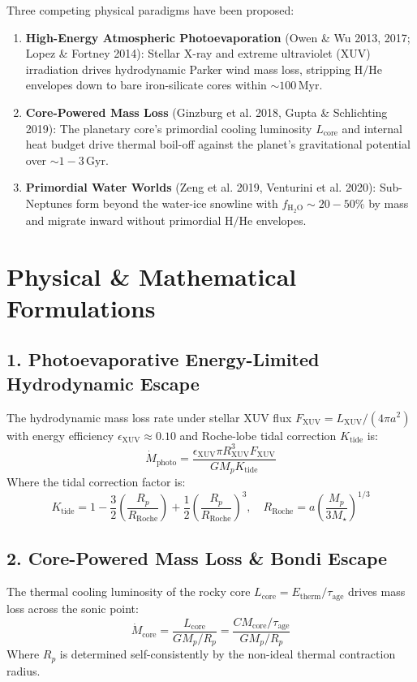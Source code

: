 \documentclass[11pt,a4paper]{article}
\begin{document}
Three competing physical paradigms have been proposed:
\begin{enumerate}
    \item \textbf{High-Energy Atmospheric Photoevaporation} (Owen \& Wu 2013, 2017; Lopez \& Fortney 2014): Stellar X-ray and extreme ultraviolet (XUV) irradiation drives hydrodynamic Parker wind mass loss, stripping $\mathrm{H/He}$ envelopes down to bare iron-silicate cores within $\sim 100\,\mathrm{Myr}$.
    \item \textbf{Core-Powered Mass Loss} (Ginzburg et al. 2018, Gupta \& Schlichting 2019): The planetary core's primordial cooling luminosity $L_{\text{core}}$ and internal heat budget drive thermal boil-off against the planet's gravitational potential over $\sim 1 - 3\,\mathrm{Gyr}$.
    \item \textbf{Primordial Water Worlds} (Zeng et al. 2019, Venturini et al. 2020): Sub-Neptunes form beyond the water-ice snowline with $f_{\mathrm{H_2O}} \sim 20 - 50\%$ by mass and migrate inward without primordial $\mathrm{H/He}$ envelopes.
\end{enumerate}

\section{Physical \& Mathematical Formulations}

\subsection{1. Photoevaporative Energy-Limited Hydrodynamic Escape}
The hydrodynamic mass loss rate under stellar XUV flux $F_{\text{XUV}} = L_{\text{XUV}} / (4\pi a^2)$ with energy efficiency $\epsilon_{\text{XUV}} \approx 0.10$ and Roche-lobe tidal correction $K_{\text{tide}}$ is:
\begin{equation}
\dot{M}_{\text{photo}} = \frac{\epsilon_{\text{XUV}} \pi R_{\text{XUV}}^3 F_{\text{XUV}}}{G M_p K_{\text{tide}}}
\end{equation}
Where the tidal correction factor is:
\begin{equation}
K_{\text{tide}} = 1 - \frac{3}{2}\left(\frac{R_p}{R_{\text{Roche}}}\right) + \frac{1}{2}\left(\frac{R_p}{R_{\text{Roche}}}\right)^3, \quad R_{\text{Roche}} = a \left(\frac{M_p}{3 M_\star}\right)^{1/3}
\end{equation}

\subsection{2. Core-Powered Mass Loss \& Bondi Escape}
The thermal cooling luminosity of the rocky core $L_{\text{core}} = E_{\text{therm}} / \tau_{\text{age}}$ drives mass loss across the sonic point:
\begin{equation}
\dot{M}_{\text{core}} = \frac{L_{\text{core}}}{G M_p / R_p} = \frac{C M_{\text{core}} / \tau_{\text{age}}}{G M_p / R_p}
\end{equation}
Where $R_p$ is determined self-consistently by the non-ideal thermal contraction radius.
\end{document}
